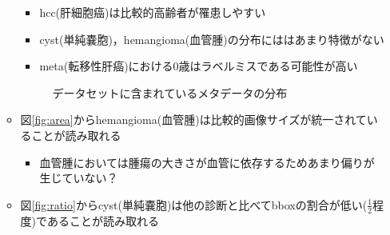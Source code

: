 \documentclass[a4j]{ujarticle}
\newcommand{\Fref}[1]{\mbox{図\ref{fig:#1}}}
\begin{document}
\begin{itemize}
\begin{itemize}
				\begin{itemize}
					\item hcc(肝細胞癌)は比較的高齢者が罹患しやすい
					\item cyst(単純嚢胞)，hemangioma(血管腫)の分布にははあまり特徴がない
					\item meta(転移性肝癌)における0歳はラベルミスである可能性が高い
				\end{itemize}
				\begin{figure}[h]
					\centering
					\caption{データセットに含まれているメタデータの分布}
				\end{figure}
				\item \Fref{area}からhemangioma(血管腫)は比較的画像サイズが統一されていることが読み取れる
				\begin{itemize}
					\item 血管腫においては腫瘍の大きさが血管に依存するためあまり偏りが生じていない？
				\end{itemize}
				\item \Fref{ratio}からcyst(単純嚢胞)は他の診断と比べてbboxの割合が低い($\frac{1}{2}$程度)であることが読み取れる
			\end{itemize}
		\end{itemize}
\end{document}
